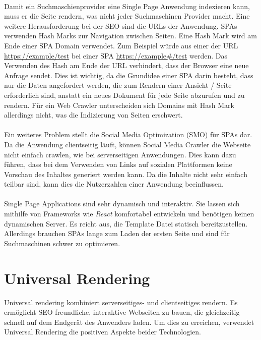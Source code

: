 \documentclass[runningheads]{llncs}
\numberwithin{figure}{section}
\begin{document}
\\
Damit ein Suchmaschienprovider eine Single Page Anwendung indexieren kann,
muss er die Seite rendern,
was nicht jeder Suchmaschinen Provider macht. 
Eine weitere Herausforderung bei der SEO sind die URLs der Anwendung. 
SPAs verwenden Hash Marks zur Navigation zwischen Seiten. 
Eine Hash Mark wird am Ende einer SPA Domain verwendet. 
Zum Beispiel würde aus einer der URL \url{https://example/test} bei einer SPA 
\url{https://example#/test} werden. 
Das Verwenden des Hash am Ende der URL verhindert, 
dass der Browser eine neue Anfrage sendet. 
Dies ist wichtig, da die Grundidee einer SPA darin besteht, 
dass nur die Daten angefordert werden, 
die zum Rendern einer Ansicht / Seite erforderlich sind, 
anstatt ein neues Dokument für jede Seite abzurufen und zu rendern. 
Für ein Web Crawler unterscheiden sich Domains mit Hash Mark allerdings 
nicht, was die Indizierung von Seiten erschwert. \cite{IsomorphicApps}
\\
\\
Ein weiteres Problem stellt die Social Media Optimization (SMO) für SPAs dar. 
Da die Anwendung clientseitig läuft, 
können Social Media Crawler die Webseite nicht einfach crawlen, 
wie bei serverseitigen Anwendungen. Dies kann dazu führen, 
dass bei dem Verwenden von Links auf sozialen Plattformen 
keine Vorschau des Inhaltes generiert werden kann. 
Da die Inhalte nicht sehr einfach teilbar sind, 
kann dies die Nutzerzahlen einer Anwendung beeinflussen.
\\
\\
Single Page Applications sind sehr dynamisch und interaktiv. 
Sie lassen sich mithilfe von Frameworks wie \textit{React} komfortabel entwickeln
und benötigen keinen dynamischen Server. Es reicht aus, 
die Template Datei statisch bereitzustellen. 
Allerdings brauchen SPAs lange zum Laden der ersten Seite
und sind für Suchmaschinen schwer zu optimieren. \cite{GoogleSearchAndJS}
\newpage

\section{Universal Rendering}
\label{sec:Universal Rendering}
Universal rendering kombiniert serverseitiges- und clientseitiges rendern. 
Es ermöglicht SEO freundliche, interaktive Webseiten zu bauen, 
die gleichzeitig schnell auf dem Endgerät des Anwenders laden. 
Um dies zu erreichen, 
verwendet Universal Rendering die positiven Aspekte beider Technologien.
\end{document}
